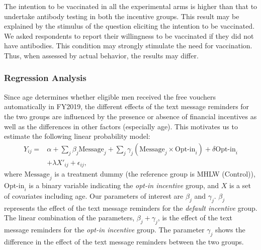 \documentclass[
      12pt,
    a4paper
]{article}
\begin{document}
The intention to be vaccinated in all the experimental arms is higher than that to undertake antibody testing in both the incentive groups. This result may be explained by the stimulus of the question eliciting the intention to be vaccinated. We asked respondents to report their willingness to be vaccinated if they did not have antibodies. This condition may strongly stimulate the need for vaccination. Thus, when assessed by actual behavior, the results may differ.

\hypertarget{regression-analysis}{%
\subsubsection{Regression Analysis}\label{regression-analysis}}

Since age determines whether eligible men received the free vouchers automatically in FY2019, the different effects of the text message reminders for the two groups are influenced by the presence or absence of financial incentives as well as the differences in other factors (especially age). This motivates us to estimate the following linear probability model:
\begin{equation}
\begin{split}
Y_{ij} = &\alpha + \sum_j \beta_j \text{Message}_j + \sum_j \gamma_j (\text{Message}_j \times \text{Opt-in}_i) + \delta \text{Opt-in}_i \\
&+ \lambda X'_{ij} + \epsilon_{ij},
\end{split} \label{eq:regression}
\end{equation}
where \(\text{Message}_j\) is a treatment dummy (the reference group is MHLW (Control)), \(\text{Opt-in}_i\) is a binary variable indicating the \emph{opt-in incentive} group, and \(X\) is a set of covariates including age. Our parameters of interest are \(\beta_j\) and \(\gamma_j\). \(\beta_j\) represents the effect of the text message reminders for the \emph{default incentive} group. The linear combination of the parameters, \(\beta_j + \gamma_j\), is the effect of the text message reminders for the \emph{opt-in incentive} group. The parameter \(\gamma_j\) shows the difference in the effect of the text message reminders between the two groups.
\end{document}
